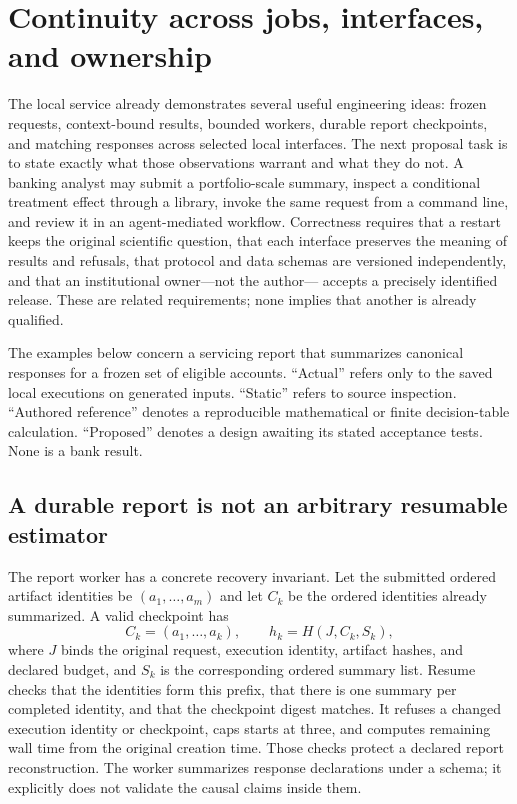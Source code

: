 \section{Continuity across jobs, interfaces, and ownership}
\label{exec17:integration-continuity}

The local service already demonstrates several useful engineering ideas:
frozen requests, context-bound results, bounded workers, durable report
checkpoints, and matching responses across selected local interfaces. The next
proposal task is to state exactly what those observations warrant and what they
do not. A banking analyst may submit a portfolio-scale summary, inspect a
conditional treatment effect through a library, invoke the same request from a
command line, and review it in an agent-mediated workflow. Correctness requires
that a restart keeps the original scientific question, that each interface
preserves the meaning of results and refusals, that protocol and data schemas
are versioned independently, and that an institutional owner—not the author—
accepts a precisely identified release. These are related requirements; none
implies that another is already qualified.

The examples below concern a servicing report that summarizes canonical
responses for a frozen set of eligible accounts. “Actual” refers only to the
saved local executions on generated inputs. “Static” refers to source
inspection. “Authored reference” denotes a reproducible mathematical or finite
decision-table calculation. “Proposed” denotes a design awaiting its stated
acceptance tests. None is a bank result.\citep{exec16_parity_observed,exec14_failure_observations}

\subsection{A durable report is not an arbitrary resumable estimator}
\label{exec17:continuity-jobs}

The report worker has a concrete recovery invariant. Let the submitted ordered
artifact identities be $(a_1,\ldots,a_m)$ and let $C_k$ be the ordered
identities already summarized. A valid checkpoint has
\[
 C_k=(a_1,\ldots,a_k),\qquad
 h_k=H(J,C_k,S_k),
\]
where $J$ binds the original request, execution identity, artifact hashes,
and declared budget, and $S_k$ is the corresponding ordered summary list.
Resume checks that the identities form this prefix, that there is one summary
per completed identity, and that the checkpoint digest matches. It refuses a
changed execution identity or checkpoint, caps starts at three, and computes
remaining wall time from the original creation time. Those checks protect a
declared report reconstruction. The worker summarizes response declarations
under a schema; it explicitly does not validate the causal claims inside them.
\citep{exec14_failure_implementation}

